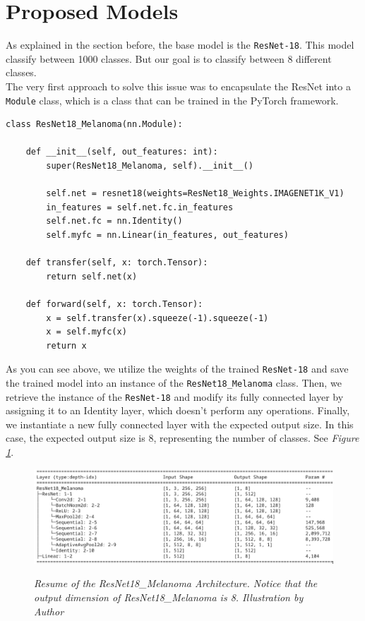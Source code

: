 \section{Proposed Models}

As explained in the section before, the base model is the {\tt ResNet-18}. This model classify
between 1000 classes. But our goal is to classify between 8 different classes. \\

The very first approach to solve this issue was to encapsulate the ResNet into a {\tt Module} class, which is a class that can be trained in the PyTorch framework.

\begin{Verbatim}[fontsize=\scriptsize]
class ResNet18_Melanoma(nn.Module):

    def __init__(self, out_features: int):
        super(ResNet18_Melanoma, self).__init__()

        self.net = resnet18(weights=ResNet18_Weights.IMAGENET1K_V1)
        in_features = self.net.fc.in_features
        self.net.fc = nn.Identity()
        self.myfc = nn.Linear(in_features, out_features)

    def transfer(self, x: torch.Tensor):
        return self.net(x)

    def forward(self, x: torch.Tensor):
        x = self.transfer(x).squeeze(-1).squeeze(-1)
        x = self.myfc(x)
        return x
\end{Verbatim}

As you can see above, we utilize the weights of the trained {\tt ResNet-18} and save the trained model into an instance of the {\tt ResNet18\_Melanoma} class. Then, we retrieve the instance of the {\tt ResNet-18} and modify its fully connected layer by assigning it to an Identity layer, which doesn't perform any operations. Finally, we instantiate a new fully connected layer with the expected output size. In this case, the expected output size is 8, representing the number of classes. See \textit{Figure \ref{fig:resnet-18-melanoma-arch}}.

\begin{figure}[H]
\centering
\includegraphics[width=\textwidth]{imatges/methodological_contribution/ResNet18_Melanoma.png}
\caption[Resume of the ResNet18\_Melanoma Architecture]{\textit{Resume of the ResNet18\_Melanoma Architecture. Notice that the output dimension of ResNet18\_Melanoma is 8. Illustration by Author}}
{\label{fig:resnet-18-melanoma-arch}}
\end{figure}


